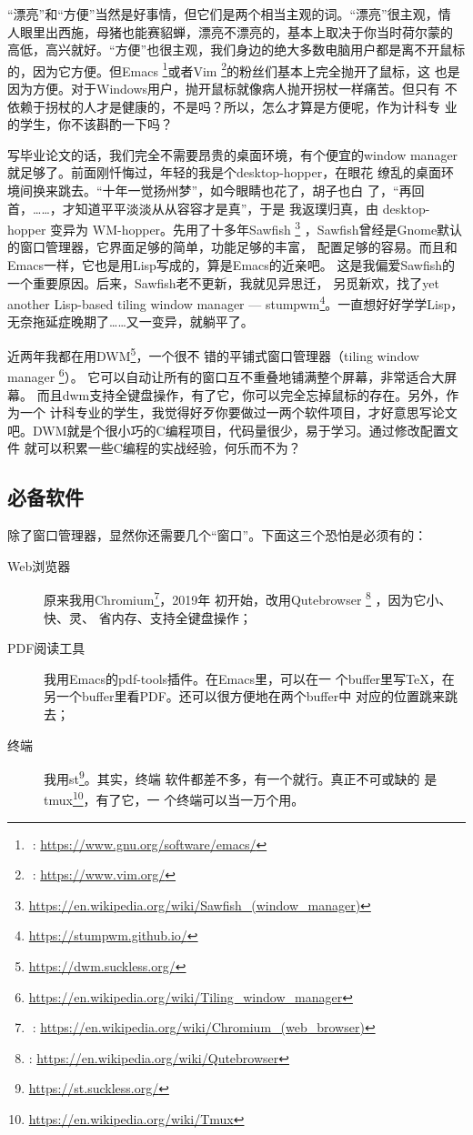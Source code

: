 “漂亮”和“方便”当然是好事情，但它们是两个相当主观的词。“漂亮”很主观，情
人眼里出西施，母猪也能赛貂蝉，漂亮不漂亮的，基本上取决于你当时荷尔蒙的
高低，高兴就好。“方便”也很主观，我们身边的绝大多数电脑用户都是离不开鼠标的，因为它方便。但Emacs%
\footnote{: \url{https://www.gnu.org/software/emacs/}}或者Vim%
\footnote{: \url{https://www.vim.org/}}的粉丝们基本上完全抛开了鼠标，这
也是因为方便。对于Windows用户，抛开鼠标就像病人抛开拐杖一样痛苦。但只有
不依赖于拐杖的人才是健康的，不是吗？所以，怎么才算是方便呢，作为计科专
业的学生，你不该斟酌一下吗？

写毕业论文的话，我们完全不需要昂贵的桌面环境，有个便宜的window
manager就足够了。前面刚忏悔过，年轻的我是个desktop-hopper，在眼花
缭乱的桌面环境间换来跳去。“十年一觉扬州梦”，如今眼睛也花了，胡子也白
了，“再回首，……，才知道平平淡淡从从容容才是真”，于是
我返璞归真，由 desktop-hopper 变异为 WM-hopper。先用了十多年Sawfish%
\footnote{\url{https://en.wikipedia.org/wiki/Sawfish_(window_manager)}}
，Sawfish曾经是Gnome默认的窗口管理器，它界面足够的简单，功能足够的丰富，
配置足够的容易。而且和Emacs一样，它也是用Lisp写成的，算是Emacs的近亲吧。
这是我偏爱Sawfish的一个重要原因。后来，Sawfish老不更新，我就见异思迁，
另觅新欢，找了yet another Lisp-based tiling window manager ---
stumpwm\footnote{\url{https://stumpwm.github.io/}}。一直想好好学学Lisp，
无奈拖延症晚期了……又一变异，就躺平了。

近两年我都在用DWM\footnote{\url{https://dwm.suckless.org/}}，一个很不
错的平铺式窗口管理器（tiling window manager%
\footnote{\url{https://en.wikipedia.org/wiki/Tiling_window_manager}}）。%
它可以自动让所有的窗口互不重叠地铺满整个屏幕，非常适合大屏幕。%
而且dwm支持全键盘操作，有了它，你可以完全忘掉鼠标的存在。另外，作为一个
计科专业的学生，我觉得好歹你要做过一两个软件项目，才好意思写论文
吧。DWM就是个很小巧的C编程项目，代码量很少，易于学习。通过修改配置文件
就可以积累一些C编程的实战经验，何乐而不为？

\subsection{必备软件}

除了窗口管理器，显然你还需要几个“窗口”。下面这三个恐怕是必须有的：

\begin{description}
\item[Web浏览器] 原来我用Chromium\footnote{%
    : \url{https://en.wikipedia.org/wiki/Chromium_(web_browser)}}，2019年
  初开始，改用Qutebrowser \footnote{%
    \qutebrowser{}: \url{https://en.wikipedia.org/wiki/Qutebrowser}} ，因为它小、快、灵、
  省内存、支持全键盘操作；
\item[PDF阅读工具] 我用Emacs的pdf-tools插件。在Emacs里，可以在一
  个buffer里写\TeX{}，在另一个buffer里看PDF。还可以很方便地在两个buffer中
  对应的位置跳来跳去；
\item[终端] 我用st\footnote{\url{https://st.suckless.org/}}。其实，终端
  软件都差不多，有一个就行。真正不可或缺的
  是tmux\footnote{\url{https://en.wikipedia.org/wiki/Tmux}}，有了它，一
  个终端可以当一万个用。
\end{description}

